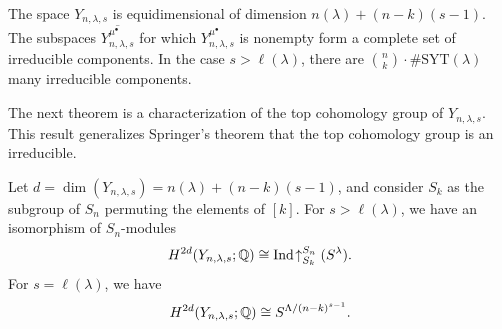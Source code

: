 \documentclass[12pt]{amsart}
\newcommand{\la}{\lambda}
\newcommand{\SYT}{\mathrm{SYT}}
\begin{document}
\begin{theorem}
The space $Y_{n,\la,s}$ is equidimensional of dimension $n(\la) + (n-k)(s-1)$. The subspaces $\overline{Y_{n,\la,s}^{\mu^\bullet}}$ for which $Y_{n,\la,s}^{\mu^\bullet}$ is nonempty form a complete set of irreducible components. In the case $s>\ell(\la)$, there are $\binom{n}{k}\cdot \#\SYT(\la)$ many irreducible components.
\end{theorem}

The next theorem is a characterization of the top cohomology group of $Y_{n,\lambda,s}$. This result generalizes Springer's theorem that the top cohomology group is an irreducible.
 

\begin{theorem}
Let $d = \dim(Y_{n,\la,s}) = n(\la) + (n-k)(s-1)$, and consider $S_k$ as the subgroup of $S_n$ permuting the elements of $[k]$. For $s>\ell(\la)$, we have an isomorphism of $S_n$-modules
\begin{align}
H^{2d}(Y_{n,\la,s};\bQ) \cong \mathrm{Ind}\!\uparrow_{S_k}^{S_n} (S^\la).
\end{align}
For $s=\ell(\la)$, we have
\begin{align}\label{eq:SLengthLambdaIso}
    H^{2d}(Y_{n,\la,s};\bQ) \cong S^{\Lambda/(n-k)^{s-1}}.
\end{align}
\end{theorem}
\end{document}
